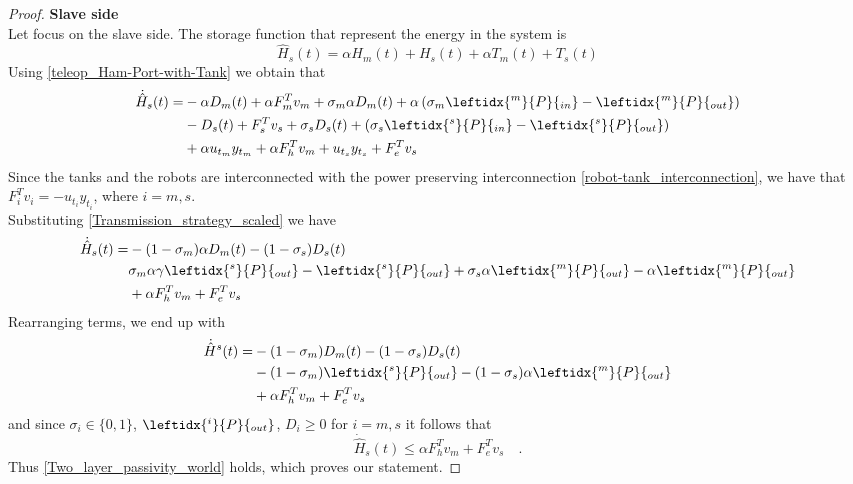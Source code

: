 \begin{proof}\textbf{Slave side}\\
Let focus on the slave side. The storage function that represent the energy in the system is
	\begin{equation}\label{slave_scaled_storage_function}
		\hat{H}_{s}(t) = \alpha H_{m}(t) + H_{s}(t) + \alpha T_{m}(t) + T_{s}(t)
	\end{equation}
	Using \eqref{teleop_Ham-Port-with-Tank} we obtain that
	\begin{equation}
		\begin{split}
		\dot{\hat{H}}_{s}(t)= & -\alpha D_{m}(t) + \alpha F^{T}_{m}v_{m}  +\sigma_{m}\alpha D_{m}(t) + \alpha\left( \sigma_{m} \leftidx{^m}{P}{_{in}} - \leftidx{^m}{P}{_{out}}\right)\\ 
		& -D_{s}(t) +  F^{T}_{s}v_{s} +\sigma_{s}D_{s}(t) + \left( \sigma_{s} \leftidx{^s}{P}{_{in}} - \leftidx{^s}{P}{_{out}}\right)\\
		& + \alpha u_{t_{m}}y_{t_{m}} + \alpha F^{T}_{h}v_{m} +u_{t_{s}}y_{t_{s}} + F^{T}_{e}v_{s}
		\end{split}
	\end{equation}	
	Since the tanks and the robots are interconnected with the power preserving interconnection \eqref{robot-tank_interconnection}, we have that $F^{T}_{i}v_{i} = -u_{t_{i}}y_{t_{i}} $, where $i=m,s$.\\
	Substituting \eqref{Transmission_strategy_scaled} we have
	\begin{equation}
		\begin{split}
			\dot{\hat{H}}_{s}(t) = & -(1 - \sigma_{m})\alpha D_{m}(t) - (1 - \sigma_{s})D_{s}(t)\\
			& \sigma_{m} \alpha \gamma \leftidx{^s}{P}{_{out}} - \leftidx{^s}{P}{_{out}} + \sigma_{s} \alpha \leftidx{^m}{P}{_{out}} - \alpha \leftidx{^m}{P}{_{out}}\\
			& + \alpha F^{T}_{h}v_{m} + F^{T}_{e}v_{s}
		\end{split}
	\end{equation}
	Rearranging terms, we end up with
	\begin{equation}
		\begin{split}
			\dot{\hat{H}}^{s}(t) = & -(1 - \sigma_{m})D_{m}(t) - (1 - \sigma_{s})D_{s}(t)\\
			& -(1 - \sigma_{m}) \leftidx{^s}{P}{_{out}} -(1 - \sigma_{s}) \alpha \leftidx{^m}{P}{_{out}} \\
			& + \alpha F^{T}_{h}v_{m} + F^{T}_{e}v_{s}
		\end{split}
	\end{equation}
	and since $\sigma_{i} \in \{0,1\}$, $\leftidx{^i}{P}{_{out}}$, $D_{i} \geq 0$ for $i=m,s$ it follows that
	\begin{equation}
			\dot{\hat{H}}_{s}(t) \leq \alpha F^{T}_{h}v_{m} + F^{T}_{e}v_{s} \quad \text{.}
	\end{equation}
	Thus \eqref{Two_layer_passivity_world} holds, which proves our statement.
\end{proof}
